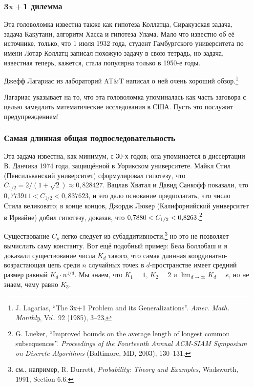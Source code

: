 \subsubsection*{$\bm{3x+1}$ дилемма}

Эта головоломка известна также как гипотеза Коллатца, Сиракузская задача, задача Какутани, алгоритм Хасса и гипотеза Улама.
Мало что известно об её источнике, только, что 1 июля 1932 года, студент Гамбургского университета по имени Лотар Коллатц записал похожую задачу в свою тетрадь, но задача, известная теперь, кажется, стала популярна только в 1950-е годы.

Джефф Лагариас из лабораторий AT\&T написал о ней очень хороший обзор.\footnote{J. Lagarias, ``The 3x+1 Problem and its Generalizations''. \emph{Amer. Math. Monthly}, Vol. 92 (1985), 3--23,%
}

Лагариас указывает на то, что эта головоломка упоминалась как часть заговора с целью замедлить математические исследования в США.
Пусть это послужит предупреждением!

\subsubsection*{Самая длинная общая подпоследовательность}

Эта задача известна, как минимум, с 30-х годов;
она упоминается в диссертации В. Данчика 1974 года, защищённой в Уорикском университете.
Майкл Стил (Пенсильванский университет) сформулировал гипотезу, что $C_{1/2} = 2/(1+\sqrt{2})\approx 0{,}828427$.
Вацлав Хватал и Давид Санкофф показали, что $0{,}773911 < C_{1/2} < 0{,}837623$, и это дало основание предполагать, что число Стила великовато;
в конце концов, Джордж Люкер (Калифорнийский университет в Ирвайне) добил гипотезу, доказав, что $0{,}7880 \z< C_{1/2} \z< 0{,}8263$.\footnote{
G. Lueker, 
``Improved bounds on the average length of longest common subsequences''. \emph{Proceedings of the Fourteenth Annual ACM-SIAM Symposium on Discrete Algorithms} (Baltimore, MD, 2003), 130–131.}

Существование $C_p$ легко следует из субаддитивности,\footnote{см., например, R. Durrett, \textit{Probability: Theory and Examples,} Wadsworth, 1991, Section 6.6.} но это не позволяет вычислить саму константу.
Вот ещё подобный пример: Бела Боллобаш и я доказали существование числа $K_d$ такого, что самая длинная координатно-возрастающая цепь среди $n$ случайных точек в $d$-пространстве имеет средний размер равный $K_d\cdot n^{1/d}$.
Мы знаем, что $K_1=1$, $K_2=2$ и $\lim_{d\to\infty} K_d=e$, но не знаем, чему равно $K_3$.

